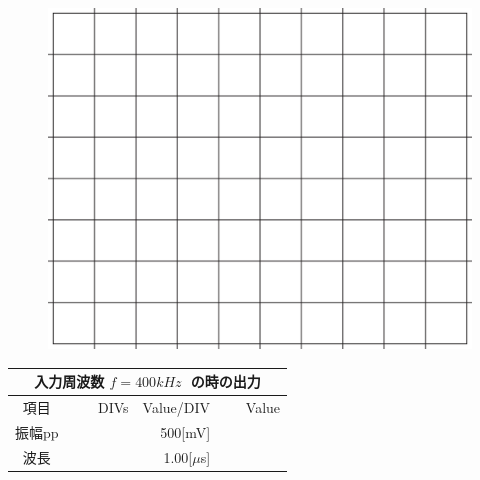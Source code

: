 \documentclass[uplatex,a4paper,11pt,oneside,openany]{jsbook}
\begin{document}
\begin{multicols}{2}
  \begin{figure}[H]
     \centering
      \includegraphics[keepaspectratio, scale=0.28, angle=0]
                  {figs/eps/grid.eps}
                  \label{fig:grid30mV}
  \end{figure}

  \begin{spacing}{1.5}
  \begin{tabular}{|c||r|r|r|}
    \multicolumn{4}{c}{入力周波数 $f=400kHz\;$ の時の出力} \\ \hline
    項目 & DIVs & Value/DIV & Value \\ \hline \hline
    振幅pp & 　　　　 & 500[mV]& 　　　　 \\ \hline
    波長 & 　　　　 & 1.00[$\mu$s]& 　　　　 \\ \hline
  \end{tabular}
\end{spacing}
\end{multicols}

\vfill
\end{document}
